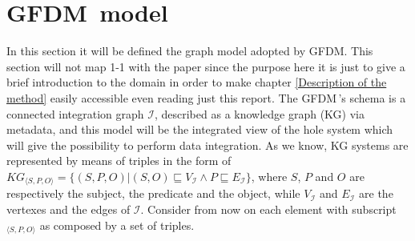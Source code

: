 \documentclass[12pt,a4paper]{report}
\newcommand\systemName{GFDM}
\newcommand\integrationGraph{\mathcal{I}}
\newcommand\integrationGraphVertex{V_{\integrationGraph}}
\newcommand\integrationGraphEdge{E_{\integrationGraph}}
\newcommand\subject{S}
\newcommand\predicate{P}
\newcommand\object{O}
\newcommand\triple[1]{#1_{\set{\subject,\predicate,\object}}}
\newcommand\set[1]{\langle #1 \rangle}
\begin{document}
\section{\systemName\, model} \label{GFDM model}
In this section it will be defined the graph model adopted by \systemName.
%
This section will not map 1-1 with the paper \cite{TKDE} since the purpose here it is just to give a brief introduction to the domain in order to make chapter \ref{Description of the method} easily accessible even reading just this report.
%
The \systemName\,'s schema is a connected integration graph $\integrationGraph$, described as a knowledge graph (KG) via metadata, and this model will be the integrated view of the hole system which will give the possibility to perform data integration.
%
As we know, KG systems are represented by means of triples in the form of $\triple{KG} = \{(\subject,\predicate,\object)|(\subject,\object)\sqsubseteq \integrationGraphVertex{} \land \predicate \sqsubseteq \integrationGraphEdge{}\}$, where $\subject$, $\predicate$ and $\object$ are respectively the subject, the predicate and the object, while $\integrationGraphVertex$ and $\integrationGraphEdge$ are the vertexes and the edges of $\integrationGraph$.
%
Consider from now on each element with subscript $\triple{}$ as composed by a set of triples.
\end{document}
